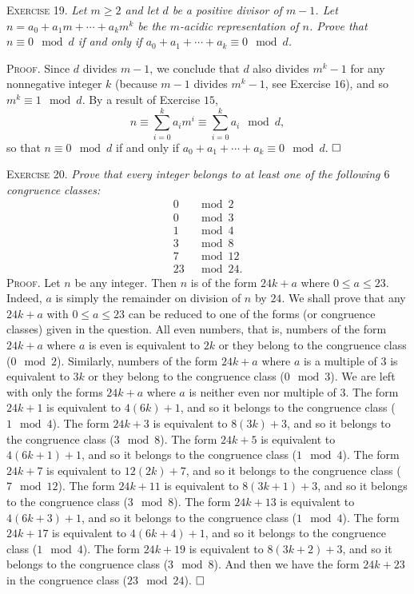 \documentclass[11pt, leqno]{article}
\newcommand{\done}{\ensuremath{\hfill\square}}
\begin{document}
\textsc{Exercise 19}. \emph{Let $m \geq 2$ and let $d$ be a positive divisor of $m-1$. Let $n = a_0 + a_1m + \cdots + a_km^k$ be the $m$-acidic representation of $n$. Prove that $n \equiv 0 \mod d$ if and only if $a_0 + a_1 + \cdots + a_k \equiv 0 \mod d$.}

\textsc{Proof}. Since $d$ divides $m-1$, we conclude that $d$ also divides $m^k-1$ for any nonnegative integer $k$ (because $m-1$ divides $m^k-1$, see Exercise $16$), and so $m^k \equiv 1 \mod d$. By a result of Exercise $15$, 
\begin{displaymath}
n \equiv \sum_{i=0}^k a_im^i \equiv \sum_{i=0}^k a_i \mod d,
\end{displaymath}
so that $n \equiv 0 \mod d$ if and only if $a_0 + a_1 + \cdots + a_k \equiv 0 \mod d$. \done

\textsc{Exercise 20}. \emph{Prove that every integer belongs to at least one of the following $6$ congruence classes: 
\begin{align*}
  0 &\mod 2 \\
  0 &\mod 3 \\
  1 &\mod 4 \\
  3 &\mod 8 \\
  7 &\mod 12 \\
  23 &\mod 24.
\end{align*}}\textsc{Proof}. Let $n$ be any integer. Then $n$ is of the form $24k + a$ where $0 \leq a \leq 23$. Indeed, $a$ is simply the remainder on division of $n$ by $24$. We shall prove that any $24k + a$ with $0 \leq a \leq 23$ can be reduced to one of the forms (or congruence classes) given in the question. All even numbers, that is, numbers of the form $24k + a$ where $a$ is even is equivalent to $2k$ or they belong to the congruence class ($0 \mod 2$). Similarly, numbers of the form $24k + a$ where $a$ is a multiple of $3$ is equivalent to $3k$ or they belong to the congruence class ($0 \mod 3$). We are left with only the forms $24k + a$ where $a$ is neither even nor multiple of $3$. The form $24k + 1$ is equivalent to $4(6k)+1$, and so it belongs to the congruence class ($1 \mod 4$). The form $24k+ 3$ is equivalent to $8(3k) + 3$, and so it belongs to the congruence class ($3 \mod 8$). The form $24k + 5$ is equivalent to $4(6k+1) + 1$, and so it belongs to the congruence class ($1 \mod 4$). The form $24k + 7$ is equivalent to $12(2k) + 7$, and so it belongs to the congruence class ($7 \mod 12$). The form $24k + 11$ is equivalent to $8(3k + 1) + 3$, and so it belongs to the congruence class ($3 \mod 8$). The form $24k + 13$ is equivalent to $4(6k + 3) + 1$, and so it belongs to the congruence class ($1 \mod 4$). The form $24k + 17$ is equivalent to $4(6k + 4) + 1$, and so it belongs to the congruence class ($1 \mod 4$). The form $24k + 19$ is equivalent to $8(3k + 2) + 3$, and so it belongs to the congruence class ($3 \mod 8$). And then we have the form $24k + 23$ in the congruence class ($23 \mod 24$). \done
\end{document}
